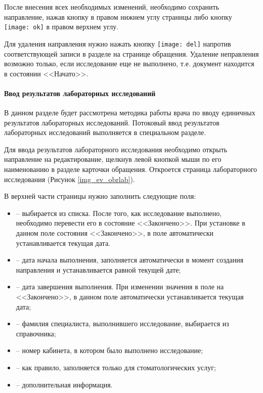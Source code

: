 После внесения всех необходимых изменений, необходимо сохранить направление, нажав кнопку  в правом нижнем углу страницы либо кнопку \texttt{[image: ok]} в правом верхнем углу.    

Для удаления направления нужно нажать кнопку \texttt{[image: del]} напротив соответствующей записи в разделе  на странице обращения. Удаление неправления возможно только, если исследование еще не выполнено, т.е. документ находится в состоянии <<Начато>>.


\paragraph{Ввод результатов лабораторных исследований} \label{ev_obr_rez}
 
В данном разделе будет рассмотрена методика работы врача по вводу единичных результатов лабораторных исследований. Потоковый ввод результатов лабораторных исследований выполняется в специальном разделе.

Для ввода результатов лабораторного исследования необходимо открыть направление на редактирование, щелкнув левой кнопкой мыши по его наименованию в разделе  карточки обращения. Откроется страница лабораторного исследования (Рисунок \ref{img_ev_obrlab}). 

В верхней части страницы нужно заполнить следующие поля: 

\begin{itemize}
 \item {} – выбирается из списка. После того, как  исследование выполнено, необходимо перевести его в состояние <<Закончено>>. При установке в данном поле состояния <<Закончено>>, в поле  автоматически устанавливается текущая дата.
 \item {} – дата начала выполнения, заполняется автоматически в момент создания направления и устанавливается равной текущей дате;
 \item {} – дата завершения выполнения. При изменении значения в поле  на <<Закончено>>, в данном поле автоматически устанавливается текущая дата;
 \item {} – фамилия специалиста, выполнившего исследование, выбирается из справочника;
 \item {} – номер кабинета, в котором было выполнено исследование;
 \item {} – как правило, заполняется только для стоматологических услуг;
 \item {} – дополнительная информация.
\end{itemize}


